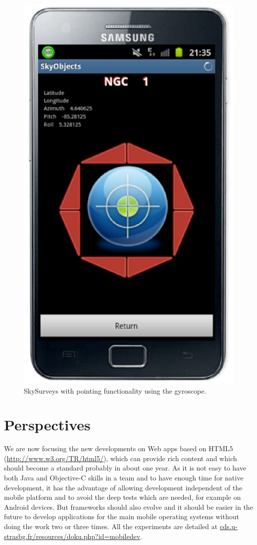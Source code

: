 \begin{figure}[h]
\includegraphics[scale=0.28]{part5/Schaaff_O28/O28_f6.eps}
\caption{SkySurveys with pointing functionality using the gyroscope.} 
\label{O28:3}
\end{figure}

\section{Perspectives}
We are now focusing the new developments on Web apps based on HTML5 (\url{http://www.w3.org/TR/html5/}), which can provide rich content and which should become a standard probably in about one year. As it is not easy to have both Java and Objective-C skills in a team and to have enough time for native development, it has the advantage of allowing development independent of the mobile platform and to avoid the deep tests which are needed, for example on Android devices. But frameworks should also evolve and it should be easier in the future to develop applications for the main mobile operating systems without doing the work two or three times. All the experiments are detailed at \url{cds.u-strasbg.fr/resources/doku.php?id=mobiledev}.

